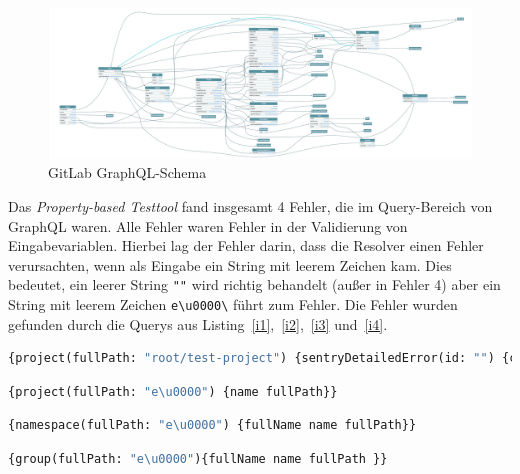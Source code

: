 \begin{figure}[H]
    \begin{center}
        \includegraphics[width=\textwidth,height=\textheight,keepaspectratio]{img/gitlabgraph}
    \end{center}
    \caption{GitLab GraphQL-Schema}
    \label{gitlabschema}
\end{figure}

Das \textit{Property-based Testtool} fand insgesamt 4 Fehler, die im Query-Bereich von GraphQL waren.
Alle Fehler waren Fehler in der Validierung von Eingabevariablen.
Hierbei lag der Fehler darin, dass die Resolver einen Fehler verursachten, wenn als Eingabe ein String mit leerem Zeichen kam.
Dies bedeutet, ein leerer String \verb+""+ wird richtig behandelt (außer in Fehler 4) aber ein String mit leerem Zeichen \verb+e\u0000\+ führt zum Fehler.
Die Fehler wurden gefunden durch die Querys aus Listing~\ref{i1},~\ref{i2},~\ref{i3} und~\ref{i4}.

\begin{lstlisting}[language=GraphQL, caption={Fehler 1\cite{issue1}}, label={i1}]
{project(fullPath: "root/test-project") {sentryDetailedError(id: "") {count}}}
\end{lstlisting}

\begin{lstlisting}[language=GraphQL, caption={Fehler 2\cite{issue2}}, label={i2}]
{project(fullPath: "e\u0000") {name fullPath}}
\end{lstlisting}

\begin{lstlisting}[language=GraphQL, caption={Fehler 3\cite{issue3}}, label={i3}]
{namespace(fullPath: "e\u0000") {fullName name fullPath}}
\end{lstlisting}

\begin{lstlisting}[language=GraphQL, caption={Fehler 4\cite{issue4}}, label={i4}]
{group(fullPath: "e\u0000"){fullName name fullPath }}
\end{lstlisting}

